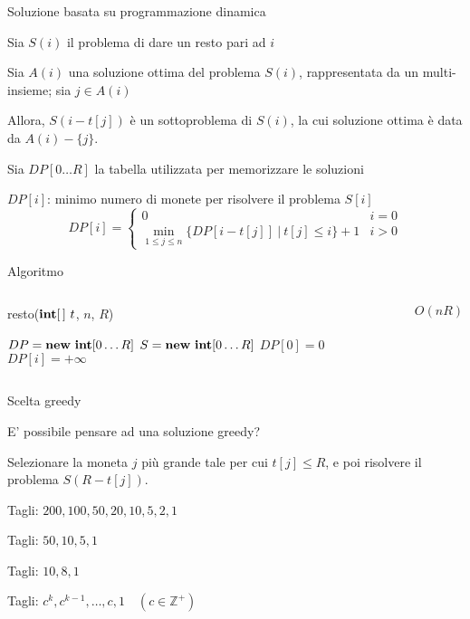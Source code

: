 \begin{frame}{Soluzione basata su programmazione dinamica}

\BI
\item Sia $S(i)$ il problema di dare un resto pari ad $i$
\item Sia $A(i)$ una soluzione ottima del problema $S(i)$, rappresentata da un 
multi-insieme; sia $j \in A(i)$
\item Allora, $S(i-t[j])$ è un sottoproblema di
$S(i)$, la cui soluzione ottima è data da $A(i)-\{ j \}$.
\EI

\BI
\item Sia $DP[0 \ldots R]$ la tabella utilizzata per memorizzare le soluzioni
\item $DP[i]$: minimo numero di monete per risolvere il problema $S[i]$
\EI
\[
DP[i] = \left\{ 
\begin{array}{ll}
  0 & i=0 \\
  \min_{1 \leq j \leq n} \{ DP[i-t[j]] ~|~ t[j] \leq i \} + 1 & i>0
  \end{array} 
\right.
\]


\end{frame}

\begin{frame}{Algoritmo}

\vspace{-6pt}
\begin{columns}[T]
\vspace{-9pt}
\begin{Procedure}
\caption[A]{\textsf{resto}($\INTARRAY\ t$, \INTEGER $n$, \INTEGER $R$)}
$DP = \NEW\ \INTEGER[0 \ldots R]$\;
$S = \NEW\ \INTEGER[0 \ldots R]$\;
$DP[0] = 0$\;
 {
  $DP[i] = +\infty$\;
   {
  }
}
\end{Procedure}
\pause
\[O(nR)\]
\end{columns}
\end{frame}


\begin{frame}{Scelta greedy}


\bigskip
{}
E' possibile pensare ad una soluzione greedy?

\pause
\bigskip
{}
Selezionare la moneta $j$ più grande tale per cui $t[j] \leq R$, e poi risolvere 
il problema $S(R-t[j])$.

\pause
\bigskip
{}
\BIL
\item Tagli: $200, 100, 50, 20, 10, 5, 2, 1$
\item Tagli: $50, 10, 5, 1$
\item Tagli: $10, 8, 1$
\item Tagli: $c^k, c^{k-1}, \ldots, c, 1 \quad (c \in \mathbb{Z^+})$
\EIL


\end{frame}

